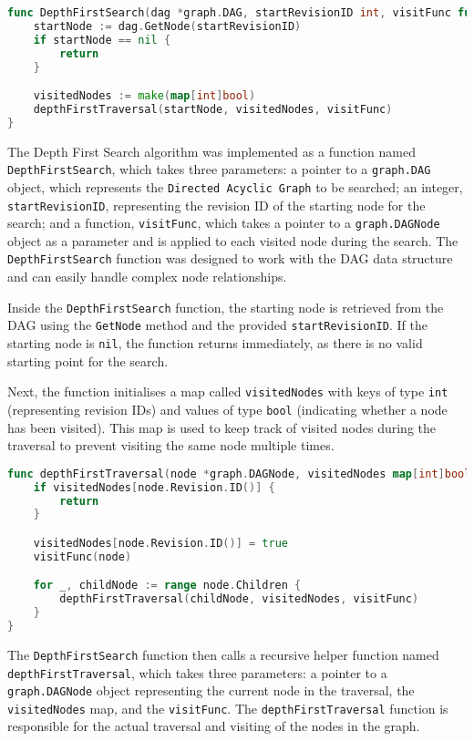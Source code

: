 \begin{lstlisting}[language=go]
func DepthFirstSearch(dag *graph.DAG, startRevisionID int, visitFunc func(*graph.DAGNode)) {
	startNode := dag.GetNode(startRevisionID)
	if startNode == nil {
		return
	}

	visitedNodes := make(map[int]bool)
	depthFirstTraversal(startNode, visitedNodes, visitFunc)
}
\end{lstlisting}
\medskip

The Depth First Search algorithm was implemented as a function named \lstinline{DepthFirstSearch}, which takes three parameters: a pointer to a \lstinline{graph.DAG} object, which represents the \lstinline{Directed Acyclic Graph} to be searched; an integer, \lstinline{startRevisionID}, representing the revision ID of the starting node for the search; and a function, \lstinline{visitFunc}, which takes a pointer to a \lstinline{graph.DAGNode} object as a parameter and is applied to each visited node during the search. The \lstinline{DepthFirstSearch} function was designed to work with the DAG data structure and can easily handle complex node relationships.
\smallskip

Inside the \lstinline{DepthFirstSearch} function, the starting node is retrieved from the DAG using the \lstinline{GetNode} method and the provided \lstinline{startRevisionID}. If the starting node is \lstinline{nil}, the function returns immediately, as there is no valid starting point for the search.
\smallskip

Next, the function initialises a map called \lstinline{visitedNodes} with keys of type \lstinline{int} (representing revision IDs) and values of type \lstinline{bool} (indicating whether a node has been visited). This map is used to keep track of visited nodes during the traversal to prevent visiting the same node multiple times.

\begin{lstlisting}[language=go]
func depthFirstTraversal(node *graph.DAGNode, visitedNodes map[int]bool, visitFunc func(*graph.DAGNode)) {
	if visitedNodes[node.Revision.ID()] {
		return
	}

	visitedNodes[node.Revision.ID()] = true
	visitFunc(node)

	for _, childNode := range node.Children {
		depthFirstTraversal(childNode, visitedNodes, visitFunc)
	}
}
\end{lstlisting}
\medskip

The \lstinline{DepthFirstSearch} function then calls a recursive helper function named \\\lstinline{depthFirstTraversal}, which takes three parameters: a pointer to a \lstinline{graph.DAGNode} object representing the current node in the traversal, the \lstinline{visitedNodes} map, and the \lstinline{visitFunc}. The \lstinline{depthFirstTraversal} function is responsible for the actual traversal and visiting of the nodes in the graph.
\smallskip

